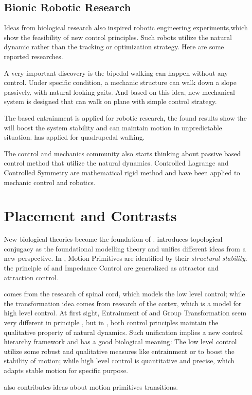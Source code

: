 \subsection{Bionic Robotic Research}
Ideas from biological research  also inspired robotic engineering experiments,which show the feasibility of new control principles.
Such robots utilize the natural dynamic rather than the tracking or optimization strategy.
Here are some reported researches.
\begin{itemize}
A very important discovery is the bipedal walking can happen without any control\citep{McGeer1990}.  
Under specific condition, a mechanic structure can walk down a slope passively, with natural looking gaits.
And based on this idea, new mechanical system is designed that can walk on plane with simple control strategy\citep{Collins2005}.

The \cpg based entrainment is applied for robotic research\citep{Williamson1999a}, the found results show the \cpg will boost the system stability and can maintain motion in unpredictable situation.
\citet{fukuoka2003adaptive} has applied \cpg for quadrupedal walking.

The control and mechanics community also starts thinking about passive based control method that utilize the natural dynamics.
Controlled Lagrange \citep{bloch2000controlled,bloch2001controlled,bloch2000potential}and Controlled Symmetry \citep{spong1998underactuated,Spong96energybased} are mathematical rigid method and have been applied to mechanic control and robotics\citep{spong2005controlled}.
\end{itemize}

\section{Placement and Contrasts}
New biological theories become the foundation of \moit.
 \moit introduces topological conjugacy as the foundational modelling theory  and unifies different ideas from a new  perspective.
In \moit, Motion Primitives are identified by their \emph{structural stability}.
the principle of \eph and Impedance Control are generalized as attractor and attraction control.

\cpg comes from the research of spinal cord, which models the low level control; while the transformation idea comes from research of the cortex, which is a model for high level control.
At first sight, Entrainment of \cpg and Group Transformation seem very different in principle , but  in \moit, both control principles maintain the qualitative property of natural dynamics.
Such unification implies a new control hierarchy framework and has a good biological meaning: 
The low level control utilize some robust and qualitative measures like entrainment or \cpg to boost the stability of motion;
while high level control is quantitative and  precise, which adapts stable motion for specific purpose.

\moit also contributes ideas about  motion primitives transitions.


 

 



